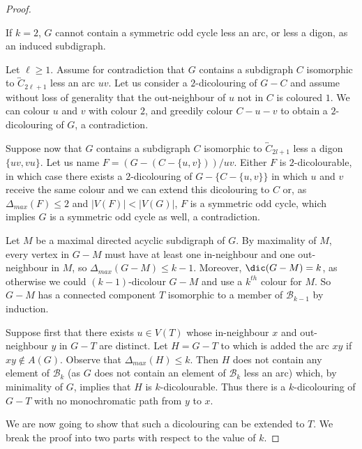 \begin{proof}
\begin{claim}
If $k = 2$, $G$ cannot contain a symmetric odd cycle less an arc, or less a digon, as an induced subdigraph. 
\end{claim}

\begin{proofclaim}

Let $\ell \geq 1$.
Assume for contradiction that $G$ contains a subdigraph $C$ isomorphic to $\overleftrightarrow{C}_{2\ell + 1}$ less an arc $uv$. Let us consider a $2$-dicolouring of $G - C$ and assume without loss of generality that the out-neighbour of $u$ not in $C$ is coloured $1$. We can colour $u$ and $v$ with colour $2$, and greedily colour $C - u - v$ to obtain a $2$-dicolouring of $G$, a contradiction.

Suppose now that $G$ contains a subdigraph $C$ isomorphic to $\overleftrightarrow{C}_{2l + 1}$ less a digon $\{uv,vu\}$. 
Let us name $F = (G - (C - \{u,v\})) / uv$. Either $F$ is $2$-dicolourable, in which case there exists a $2$-dicolouring of $G - \{C-\{u,v\}\}$ in which $u$ and $v$ receive the same colour and we can extend this dicolouring to $C$ or, as $\Delta_{max}(F) \leq 2$ and $|V(F)| < |V(G)|$, $F$ is a symmetric odd cycle, which implies $G$ is a symmetric odd cycle as well, a contradiction.
\end{proofclaim}

Let $M$ be a maximal directed acyclic subdigraph of $G$. By maximality of $M$, every vertex in $G-M$ must have at least one in-neighbour and one out-neighbour in $M$, so $\Delta_{max}(G - M) \leq k-1$. 
Moreover, $\dic(G - M) = k$,  as otherwise we could $(k - 1)$-dicolour $G - M$ and use a $k^{th}$ colour for $M$. So $G-M$ has a connected component $T$ isomorphic to a member of $\mathcal B_{k-1}$ by induction. 

Suppose first that there exists $u \in V(T)$ whose in-neighbour $x$ and out-neighbour $y$ in $G - T$ are distinct. 
Let $H = G - T$ to which is added the arc $xy$ if   $xy \notin A(G)$. 
Observe that $\Delta_{max}(H) \leq k$. 
Then $H$ does not contain any element of $\mathcal B_{k}$ (as $G$ does not contain an element of $\mathcal B_{k}$ less an arc) which, by minimality of $G$, implies that $H$ is $k$-dicolourable. Thus there is a $k$-dicolouring of $G - T$ with no monochromatic path from $y$ to $x$.

We are now going to show that such a dicolouring can be extended to $T$. We break the proof into two parts with respect to the value of $k$. 


\end{proof}
